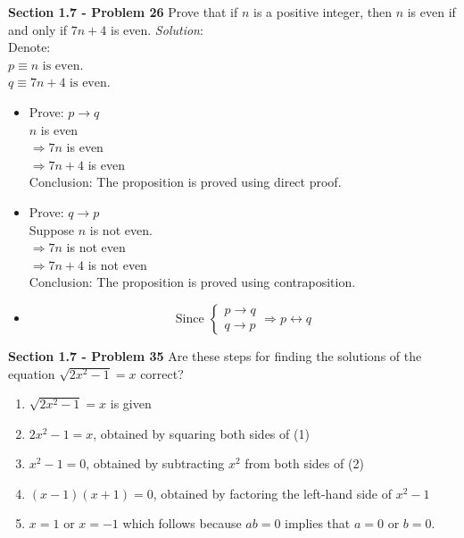 \documentclass[10pt]{article}
\renewcommand{\implies}{\rightarrow}
\renewcommand{\iff}{\leftrightarrow}
\begin{document}
\clearpage
\textbf{Section 1.7 - Problem 26} Prove that if $n$ is a positive integer, then $n$
is even if and only if $7n + 4$ is even.
\bigbreak
\textit{Solution}: \\

    Denote: \\
    $p \equiv n \mbox{ is even}$. \\
    $q \equiv 7n + 4 \mbox{ is even}$. \\
    \begin{itemize}
        \item Prove: $p \implies q$ \\
            $n$ is even \\
            $\Rightarrow 7n$ is even \\
            $\Rightarrow 7n + 4$ is even \\
            Conclusion: The proposition is proved using direct proof.
        \item Prove: $q \implies p$ \\
            Suppose $n$ is not even. \\
            $\Rightarrow 7n$ is not even \\
            $\Rightarrow 7n + 4$ is not even \\
            Conclusion: The proposition is proved using contraposition.
        \item
        \begin{equation}
            \mbox{Since }
            \begin{cases}
                p \implies q \\
                q \implies p 
            \end{cases}
            \Rightarrow p \iff q
        \end{equation}
    \end{itemize}

\clearpage
\textbf{Section 1.7 - Problem 35} Are these steps for finding the solutions of
the equation $\sqrt{2x^2 - 1} = x$ correct?
\begin{enumerate}
    \item $\sqrt{2x^2 - 1} = x$ is given
    \item $2x^2 - 1 = x$, obtained by squaring both sides of (1)
    \item $x^2 - 1 = 0$, obtained by subtracting $x^2$ from both sides of (2)
    \item $(x - 1)(x + 1) = 0$, obtained by factoring the left-hand side of
        $x^2 - 1$
    \item $x = 1$ or $x = -1$ which follows because $ab = 0$ implies that $a = 0$
        or $b = 0$.
\end{enumerate}
\end{document}
